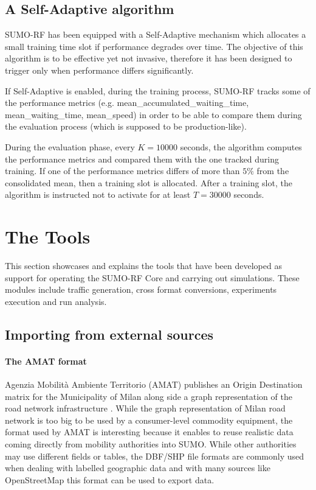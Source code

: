 \subsection{A Self-Adaptive algorithm}

SUMO-RF has been equipped with a Self-Adaptive mechanism which allocates a small training time slot if performance degrades over time.
The objective of this algorithm is to be effective yet not invasive, therefore it has been designed to trigger only when performance differs significantly.

If Self-Adaptive is enabled, during the training process, SUMO-RF tracks some of the performance metrics (e.g. mean\_accumulated\_waiting\_time, mean\_waiting\_time, mean\_speed) in order to be able to compare them during the evaluation process (which is supposed to be production-like).

During the evaluation phase, every $K = 10000$ seconds, the algorithm computes the performance metrics and compared them with the one tracked during training.
If one of the performance metrics differs of more than $5\%$ from the consolidated mean, then a training slot is allocated.
After a training slot, the algorithm is instructed not to activate for at least $T = 30000$ seconds.

\section{The Tools}

This section showcases and explains the tools that have been developed as support for operating the SUMO-RF Core and carrying out simulations.
These modules include traffic generation, cross format conversions, experiments execution and run analysis.

\subsection{Importing from external sources}

\paragraph{The AMAT format}

Agenzia Mobilit\`a Ambiente Territorio (AMAT) publishes an Origin Destination matrix for the Municipality of Milan along side a graph representation of the road network infrastructure \cite{ODMilano2010}.
While the graph representation of Milan road network is too big to be used by a consumer-level commodity equipment, the format used by AMAT is interesting because it enables to reuse realistic data coming directly from mobility authorities into SUMO.
While other authorities may use different fields or tables, the DBF/SHP file formats are commonly used when dealing with labelled geographic data and with many sources like OpenStreetMap this format can be used to export data.

